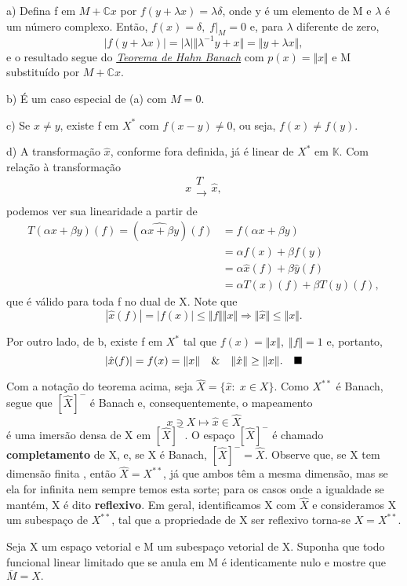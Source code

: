 \documentclass[../functional_analysis.tex]{subfiles}
\begin{document}
\begin{proof*}
	a) Defina f em \(M+\mathbb{C}x\) por \(f(y+\lambda x)=\lambda \delta \), onde y é um elemento de M e \( \lambda \) é um número complexo. Então, \(f(x)=\delta ,\; f|_{M}=0\) e, para \(\lambda \) diferente de zero,
	\[
		|f(y+\lambda x)|=|\lambda |\Vert \lambda^{-1}y + x \Vert=\Vert y+\lambda x \Vert,
	\]
	e o resultado segue do \hyperlink{complex_hahn_banach}{\textit{Teorema de Hahn Banach}} com \(p(x)=\Vert x \Vert\) e M substituído por \(M + \mathbb{C}x\).

	b) É um caso especial de (a) com \(M=0.\)

	c) Se \(x\neq y\), existe f em \(X^{*}\) com \(f(x-y)\neq 0\), ou seja, \(f(x)\neq f(y)\).

	d) A transformação \(\hat{x}\), conforme fora definida, já é linear de \(X^{*}\) em \(\mathbb{K}.\) Com relação à transformação
	\[
		x\substack{T \\ \longrightarrow \\ }\hat{x},
	\]
	podemos ver sua linearidade a partir de
	\begin{align*}
		T(\alpha x+\beta y)(f)=(\hat{\alpha x+\beta y})(f) & =f(\alpha x+\beta y)                \\
		                                                   & =\alpha f(x)+ \beta f(y)            \\
		                                                   & =\alpha \hat{x}(f)+\beta \hat{y}(f) \\
		                                                   & =\alpha T(x)(f)+\beta T(y)(f),
	\end{align*}
	que é válido para toda f no dual de X. Note que
	\[
		|\hat{x}(f)|=|f(x)|\leq \Vert f \Vert \Vert x \Vert \Rightarrow \Vert \hat{x} \Vert \leq \Vert x \Vert.
	\]

	Por outro lado, de b, existe f em \(X^{*}\) tal que \(f(x)=\Vert x \Vert,\; \Vert f \Vert=1\) e, portanto,
	\[
		|\hat{x}(f)| = f(x) = \Vert x \Vert \quad\&\quad \Vert \hat{x} \Vert\geq \Vert x \Vert.\quad \text{$\blacksquare$}
	\]
\end{proof*}

Com a notação do teorema acima, seja \(\hat{X}=\{\hat{x}:\; x\in X\}.\) Como \(X^{**}\) é Banach, segue que \([\hat{X}]^{-}\) é Banach e, consequentemente, o mapeamento
\[
	x\ni X \mapsto \hat{x}\in \hat{X}
\]
é uma imersão densa de X em \([\hat{X}]^{-}\). O espaço \([\hat{X}]^{-}\) é chamado \textbf{completamento} de X, e, se X é Banach, \([\hat{X}]^{-}=\hat{X}.\) Observe que, se X tem dimensão finita , então \(\hat{X}=X^{**}\), já que ambos têm a mesma dimensão, mas se ela for infinita nem sempre temos esta sorte; para os casos onde a igualdade se mantém, X é dito \textbf{reflexivo}. Em geral, identificamos X com \(\hat{X}\) e consideramos X um subespaço de \(X^{**}\), tal que a propriedade de X ser reflexivo torna-se \(X=X^{**}.\)
\begin{exr}
	Seja X um espaço vetorial e M um subespaço vetorial de X. Suponha que todo funcional linear limitado que se anula em M é identicamente nulo e mostre que \(\overline{M}=X.\)
\end{exr}
\end{document}
